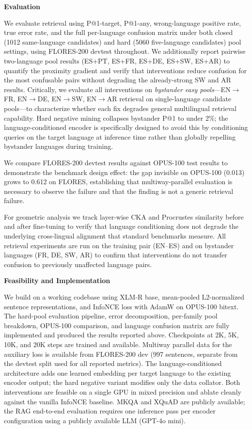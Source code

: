 \documentclass[11pt]{article}
\begin{document}
\textbf{Evaluation}

We evaluate retrieval using P@1-target, P@1-any, wrong-language positive rate, true error
rate, and the full per-language confusion matrix under both closed (1012 same-language
candidates) and hard (5060 five-language candidates) pool settings, using FLORES-200
devtest throughout. We additionally report pairwise two-language pool results (ES+PT,
ES+FR, ES+DE, ES+SW, ES+AR) to quantify the proximity gradient and verify that
interventions reduce confusion for the most confusable pairs without degrading the
already-strong SW and AR results. Critically, we evaluate all interventions on
\textit{bystander easy pools}---EN$\to$FR, EN$\to$DE, EN$\to$SW, EN$\to$AR retrieval
on single-language candidate pools---to characterize whether each fix degrades general
multilingual retrieval capability. Hard negative mining collapses bystander P@1 to under
2\%; the language-conditioned encoder is specifically designed to avoid this by
conditioning queries on the target language at inference time rather than globally
repelling bystander languages during training.

We compare FLORES-200 devtest results against OPUS-100 test results to demonstrate the
benchmark design effect: the gap invisible on OPUS-100 (0.013) grows to 0.612 on
FLORES, establishing that multiway-parallel evaluation is necessary to observe the failure
and that the finding is not a generic retrieval failure.

For geometric analysis we track layer-wise CKA and Procrustes similarity before and after
fine-tuning to verify that language conditioning does not degrade the underlying cross-lingual
alignment that standard benchmarks measure. All retrieval experiments are run on the
training pair (EN--ES) and on bystander languages (FR, DE, SW, AR) to confirm that
interventions do not transfer confusion to previously unaffected language pairs.

\textbf{Feasibility and Implementation}

We build on a working codebase using XLM-R base, mean-pooled L2-normalized sentence
representations, and InfoNCE loss with AdamW on OPUS-100 bitext. The hard-pool evaluation
pipeline, error decomposition, per-family pool breakdown, OPUS-100 comparison, and language
confusion matrix are fully implemented and produced the results reported above. Checkpoints
at 2K, 5K, 10K, and 20K steps are trained and available. Multiway parallel data for the
auxiliary loss is available from FLORES-200 dev (997 sentences, separate from the devtest
split used for all reported metrics). The language-conditioned architecture adds one
learned embedding per target language to the existing encoder output; the hard negative
variant modifies only the data collator. Both interventions are feasible on a single GPU
in mixed precision and ablate cleanly against the vanilla InfoNCE baseline. MKQA and
XQuAD are publicly available; the RAG end-to-end evaluation requires one inference pass
per encoder configuration using a publicly available LLM (GPT-4o mini).
\end{document}
